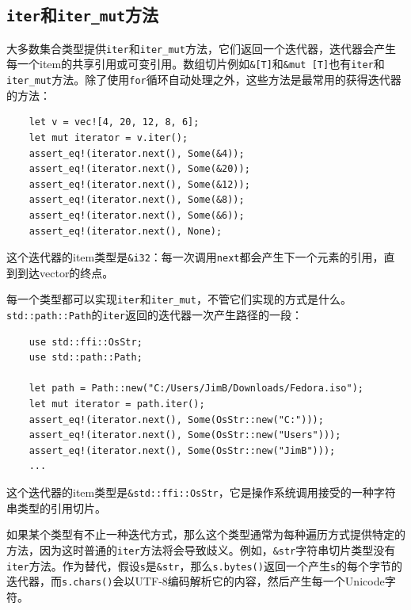 \subsection{\texttt{iter}和\texttt{iter\_mut}方法}\label{IterMethod}
大多数集合类型提供\texttt{iter}和\texttt{iter\_mut}方法，它们返回一个迭代器，迭代器会产生每一个item的共享引用或可变引用。数组切片例如\texttt{\&[T]}和\texttt{\&mut [T]}也有\texttt{iter}和\texttt{iter\_mut}方法。除了使用\texttt{for}循环自动处理之外，这些方法是最常用的获得迭代器的方法：
\begin{verbatim}
    let v = vec![4, 20, 12, 8, 6];
    let mut iterator = v.iter();
    assert_eq!(iterator.next(), Some(&4));
    assert_eq!(iterator.next(), Some(&20));
    assert_eq!(iterator.next(), Some(&12));
    assert_eq!(iterator.next(), Some(&8));
    assert_eq!(iterator.next(), Some(&6));
    assert_eq!(iterator.next(), None);
\end{verbatim}

这个迭代器的item类型是\texttt{\&i32}：每一次调用\texttt{next}都会产生下一个元素的引用，直到到达vector的终点。

每一个类型都可以实现\texttt{iter}和\texttt{iter\_mut}，不管它们实现的方式是什么。\texttt{std::path::Path}的\texttt{iter}返回的迭代器一次产生路径的一段：
\begin{verbatim}
    use std::ffi::OsStr;
    use std::path::Path;

    let path = Path::new("C:/Users/JimB/Downloads/Fedora.iso");
    let mut iterator = path.iter();
    assert_eq!(iterator.next(), Some(OsStr::new("C:")));
    assert_eq!(iterator.next(), Some(OsStr::new("Users")));
    assert_eq!(iterator.next(), Some(OsStr::new("JimB")));
    ...
\end{verbatim}

这个迭代器的item类型是\texttt{\&std::ffi::OsStr}，它是操作系统调用接受的一种字符串类型的引用切片。

如果某个类型有不止一种迭代方式，那么这个类型通常为每种遍历方式提供特定的方法，因为这时普通的\texttt{iter}方法将会导致歧义。例如，\texttt{\&str}字符串切片类型没有\texttt{iter}方法。作为替代，假设\texttt{s}是\texttt{\&str}，那么\texttt{s.bytes()}返回一个产生\texttt{s}的每个字节的迭代器，而\texttt{s.chars()}会以UTF-8编码解析它的内容，然后产生每一个Unicode字符。

